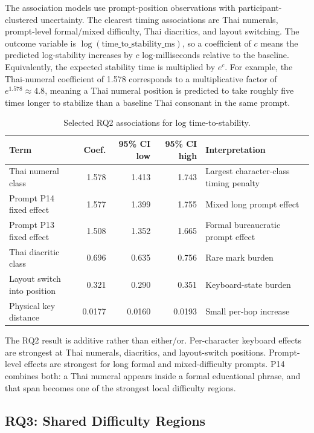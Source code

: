 \documentclass[11pt,a4paper]{article}
\begin{document}
The association models use prompt-position observations with participant-clustered uncertainty. The clearest timing associations are Thai numerals, prompt-level formal/mixed difficulty, Thai diacritics, and layout switching. The outcome variable is $\log(\text{time\_to\_stability\_ms})$, so a coefficient of $c$ means the predicted log-stability increases by $c$ log-milliseconds relative to the baseline. Equivalently, the expected stability time is multiplied by $e^c$. For example, the Thai-numeral coefficient of 1.578 corresponds to a multiplicative factor of $e^{1.578} \approx 4.8$, meaning a Thai numeral position is predicted to take roughly five times longer to stabilize than a baseline Thai consonant in the same prompt.

\begin{table}[H]
\centering
\caption{Selected RQ2 associations for log time-to-stability.}
\label{tab:rq2_coeff}
\small
\begin{tabularx}{\linewidth}{l r r r Y}
\toprule
Term & Coef. & 95\% CI low & 95\% CI high & Interpretation \\
\midrule
Thai numeral class & 1.578 & 1.413 & 1.743 & Largest character-class timing penalty \\
Prompt P14 fixed effect & 1.577 & 1.399 & 1.755 & Mixed long prompt effect \\
Prompt P13 fixed effect & 1.508 & 1.352 & 1.665 & Formal bureaucratic prompt effect \\
Thai diacritic class & 0.696 & 0.635 & 0.756 & Rare mark burden \\
Layout switch into position & 0.321 & 0.290 & 0.351 & Keyboard-state burden \\
Physical key distance & 0.0177 & 0.0160 & 0.0193 & Small per-hop increase \\
\bottomrule
\end{tabularx}
\end{table}

The RQ2 result is additive rather than either/or. Per-character keyboard effects are strongest at Thai numerals, diacritics, and layout-switch positions. Prompt-level effects are strongest for long formal and mixed-difficulty prompts. P14 combines both: a Thai numeral appears inside a formal educational phrase, and that span becomes one of the strongest local difficulty regions.

\subsection{RQ3: Shared Difficulty Regions}
\end{document}
